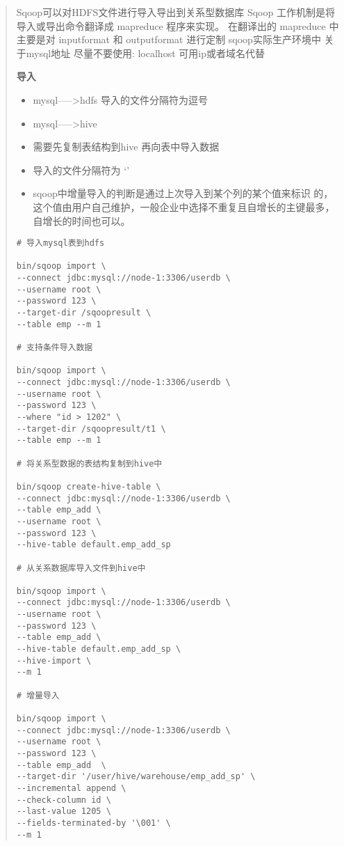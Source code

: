 \begin{quote}
Sqoop可以对HDFS文件进行导入导出到关系型数据库 Sqoop
工作机制是将导入或导出命令翻译成 mapreduce 程序来实现。 在翻译出的
mapreduce 中主要是对 inputformat 和 outputformat 进行定制
sqoop实际生产环境中 关于mysql地址 尽量不要使用: localhost
可用ip或者域名代替

\textbf{导入}

\begin{itemize}
\item
  mysql-----\textgreater{}hdfs 导入的文件分隔符为逗号
\item
  mysql-----\textgreater{}hive
\item
  需要先复制表结构到hive 再向表中导入数据
\item
  导入的文件分隔符为 `'
\item
  sqoop中增量导入的判断是通过上次导入到某个列的某个值来标识
  的，这个值由用户自己维护，一般企业中选择不重复且自增长的主键最多，自增长的时间也可以。
\end{itemize}

\begin{verbatim}
# 导入mysql表到hdfs

bin/sqoop import \
--connect jdbc:mysql://node-1:3306/userdb \
--username root \
--password 123 \
--target-dir /sqoopresult \
--table emp --m 1

# 支持条件导入数据

bin/sqoop import \
--connect jdbc:mysql://node-1:3306/userdb \
--username root \
--password 123 \
--where "id > 1202" \
--target-dir /sqoopresult/t1 \
--table emp --m 1

# 将关系型数据的表结构复制到hive中

bin/sqoop create-hive-table \
--connect jdbc:mysql://node-1:3306/userdb \
--table emp_add \
--username root \
--password 123 \
--hive-table default.emp_add_sp

# 从关系数据库导入文件到hive中

bin/sqoop import \
--connect jdbc:mysql://node-1:3306/userdb \
--username root \
--password 123 \
--table emp_add \
--hive-table default.emp_add_sp \
--hive-import \
--m 1

# 增量导入

bin/sqoop import \
--connect jdbc:mysql://node-1:3306/userdb \
--username root \
--password 123 \
--table emp_add  \
--target-dir '/user/hive/warehouse/emp_add_sp' \
--incremental append \
--check-column id \
--last-value 1205 \
--fields-terminated-by '\001' \
--m 1
\end{verbatim}


\end{quote}
